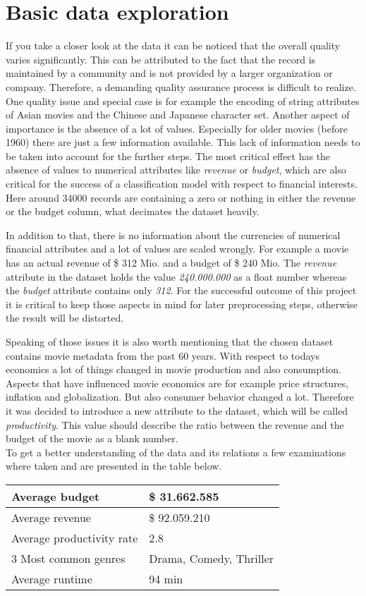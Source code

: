 \section{Basic data exploration}
\label{sec:data_exploration}
If you take a closer look at the data it can be noticed that the overall quality varies significantly. This can be attributed to the fact that the record is maintained by a community and is not provided by a larger organization or company. Therefore, a demanding quality assurance process is difficult to realize. One  quality issue and special case is for example the encoding of string attributes of Asian movies and the Chinese and Japanese character set. Another aspect of importance is the absence of a lot of values. Especially for older movies (before 1960) there are just a few information available. This lack of information needs to be taken into account for the further steps. The most critical effect has the absence of values to numerical attributes like \textit{revenue} or \textit{budget}, which are also critical for the success of a classification model with respect to financial interests. Here around 34000 records are containing a zero or nothing in either the revenue or the budget column, what decimates the dataset heavily. 

In addition to that, there is no information about the currencies of numerical financial attributes and a lot of values are scaled wrongly. For example a movie has an actual revenue of \$ 312 Mio. and a budget of \$ 240 Mio. The \textit{revenue} attribute in the dataset holds the value \textit{240.000.000} as a float number whereas the \textit{budget} attribute contains only \textit{312}. For the successful outcome of this project it is critical to keep those aspects in mind for later preprocessing steps, otherwise the result will be distorted. 

Speaking of those issues it is also worth mentioning that the chosen dataset contains movie metadata from the past 60 years. With respect to todays economics a lot of things changed in movie production and also consumption. Aspects that have influenced movie economics are for example price structures, inflation and globalization. But also consumer behavior changed a lot. Therefore it was decided to introduce a new attribute to the dataset, which will be called \textit{productivity}. This value should describe the ratio between the revenue and the budget of the movie as a blank number.
\\

To get a better understanding of the data and its relations a few examinations where taken and are presented in the table below.
\begin{center}
	\begin{tabular}{| l | l |}
	\hline
	Average budget & \$ 31.662.585 \\ \hline
	Average revenue & \$ 92.059.210 \\ \hline
	Average productivity rate & 2.8 \\ \hline
	3 Most common genres & Drama, Comedy, Thriller \\ \hline
	Average runtime & 94 min \\ \hline
	\end{tabular}
\end{center} 